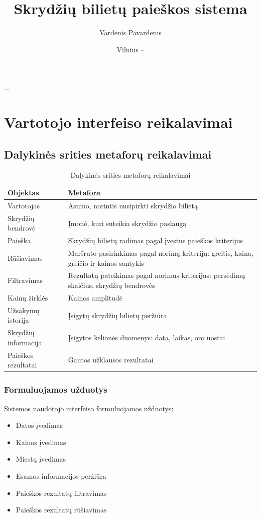\documentclass{VUMIFPSkursinis}
\title{Skrydžių bilietų paieškos sistema}
\author{Vardenis Pavardenis}
\date{Vilnius – \the\year}
\begin{document}
\maketitle

\tableofcontents

...

\section{Vartotojo interfeiso reikalavimai}

\subsection{Dalykinės srities metaforų reikalavimai}

\begin{table}[H]\footnotesize
  \centering
  \caption{Dalykinės srities metaforų reikalavimai}
  {\begin{tabular}{|l|l|} \hline
    Objektas & Metafora \\
    \hline
    \hline
    Vartotojas  & Asmuo, norintis nusipirkti skrydžio bilietą \\
    \hline
    Skrydžių bendrovė  & Įmonė, kuri suteikia skrydžio paslaugą \\
    \hline
    Paieška & Skrydžių bilietų radimas pagal įvestus paieškos kriterijus \\
    \hline
    Rūšiavimas & Maršruto pasirinkimas pagal norimą kriterijų: greitis, kaina, greičio ir kainos santykis \\
    \hline
    Filtravimas & Rezultatų pateikimas pagal norimus kriterijus: persėdimų skaičius, skrydžių bendrovės \\
    \hline
    Kainų žirklės & Kainos amplitudė \\
    \hline
    Užsakymų istorija & Įsigytų skrydžių bilietų peržiūra \\
    \hline
    Skrydžių informacija & Įsigytos kelionės duomenys: data, laikas, oro uostai \\
    \hline
    Paieškos rezultatai & Gautos užklausos rezultatai \\
    \hline
  \end{tabular}}
  \label{tab:table example}
\end{table}

\subsubsection{Formuluojamos užduotys}
Sistemos naudotojo interfeiso formuluojamos užduotys:
\begin{itemize}
  \item Datos įvedimas
  \item Kainos įvedimas
  \item Miestų įvedimas
  \item Esamos informacijos peržiūra
  \item Paieškos rezultatų filtravimas
  \item Paieškos rezultatų rūšiavimas
\end{itemize}
\end{document}
